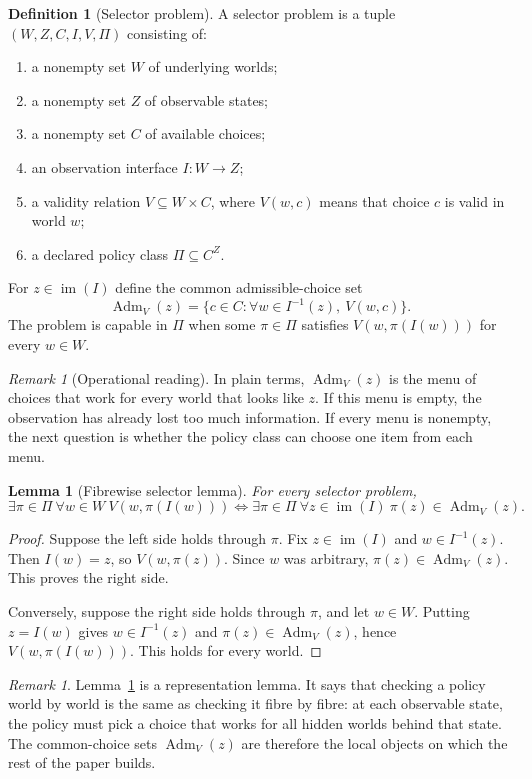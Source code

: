 \documentclass[11pt]{article}
\theoremstyle{plain}
\newtheorem{lemma}[theorem]{Lemma}
\theoremstyle{definition}
\newtheorem{definition}[theorem]{Definition}
\theoremstyle{remark}
\newtheorem{remark}[theorem]{Remark}
\newcommand{\im}{\operatorname{im}}
\newcommand{\Adm}{\operatorname{Adm}}
\begin{document}
\begin{definition}[Selector problem]\label{def:selector}
A selector problem is a tuple $(W,Z,C,I,V,\Pi)$ consisting of:
\begin{enumerate}[label=(\roman*)]
\item a nonempty set $W$ of underlying worlds;
\item a nonempty set $Z$ of observable states;
\item a nonempty set $C$ of available choices;
\item an observation interface $I:W\to Z$;
\item a validity relation $V\subseteq W\times C$, where $V(w,c)$ means that
choice $c$ is valid in world $w$;
\item a declared policy class $\Pi\subseteq C^Z$.
\end{enumerate}
For $z\in\im(I)$ define the common admissible-choice set
\[
\Adm_V(z)=\{c\in C:\forall w\in I^{-1}(z),\ V(w,c)\}.
\]
The problem is capable in $\Pi$ when some $\pi\in\Pi$ satisfies
$V(w,\pi(I(w)))$ for every $w\in W$.
\end{definition}

\begin{remark}[Operational reading]
In plain terms, $\Adm_V(z)$ is the menu of choices that work for every world
that looks like $z$. If this menu is empty, the observation has already lost too
much information. If every menu is nonempty, the next question is whether the
policy class can choose one item from each menu.
\end{remark}

\begin{lemma}[Fibrewise selector lemma]\label{lem:selector}
For every selector problem,
\[
\exists\pi\in\Pi\ \forall w\in W\ V(w,\pi(I(w)))
\iff
\exists\pi\in\Pi\ \forall z\in\im(I)\ \pi(z)\in\Adm_V(z).
\]
\end{lemma}

\begin{proof}
Suppose the left side holds through $\pi$. Fix $z\in\im(I)$ and
$w\in I^{-1}(z)$. Then $I(w)=z$, so $V(w,\pi(z))$. Since $w$ was arbitrary,
$\pi(z)\in\Adm_V(z)$. This proves the right side.

Conversely, suppose the right side holds through $\pi$, and let $w\in W$.
Putting $z=I(w)$ gives $w\in I^{-1}(z)$ and
$\pi(z)\in\Adm_V(z)$, hence $V(w,\pi(I(w)))$. This holds for every world.
\end{proof}

\begin{remark}
Lemma~\ref{lem:selector} is a representation lemma. It says that checking a
policy world by world is the same as checking it fibre by fibre: at each
observable state, the policy must pick a choice that works for all hidden worlds
behind that state. The common-choice sets $\Adm_V(z)$ are therefore the local
objects on which the rest of the paper builds.
\end{remark}
\end{document}
